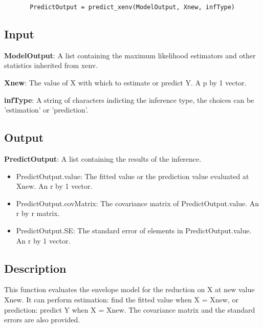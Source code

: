 \documentclass[a4paper,11pt,openany]{memoir}
\begin{document}
\begin{verbatim}       PredictOutput = predict_xenv(ModelOutput, Xnew, infType)\end{verbatim}
    

\subsection*{Input}

\begin{par}
\textbf{ModelOutput}: A list containing the maximum likelihood estimators and other statistics inherited from xenv.
\end{par} \vspace{1em}
\begin{par}
\textbf{Xnew}: The value of X with which to estimate or predict Y.  A p by 1 vector.
\end{par} \vspace{1em}
\begin{par}
\textbf{infType}: A string of characters indicting the inference type, the choices can be 'estimation' or 'prediction'.
\end{par} \vspace{1em}


\subsection*{Output}

\begin{par}
\textbf{PredictOutput}: A list containing the results of the inference.
\end{par} \vspace{1em}
\begin{itemize}
\setlength{\itemsep}{-1ex}
   \item PredictOutput.value: The fitted value or the prediction value evaluated at Xnew. An r by 1 vector.
   \item PredictOutput.covMatrix: The covariance matrix of PredictOutput.value. An r by r matrix.
   \item PredictOutput.SE: The standard error of elements in PredictOutput.value. An r by 1 vector.
\end{itemize}


\subsection*{Description}

\begin{par}
This function evaluates the envelope model for the reduction on X at new value Xnew.  It can perform estimation: find the fitted value when X = Xnew, or prediction: predict Y when X = Xnew.  The covariance matrix and the standard errors are also provided.
\end{par} \vspace{1em}
\end{document}
